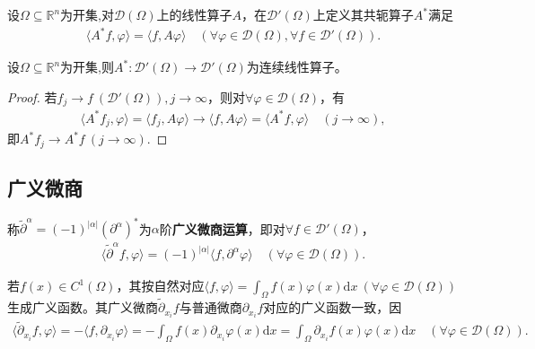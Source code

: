 \documentclass[../../main.tex]{subfiles}%
\begin{document}
\begin{definition}
设$\Omega\subseteq\mathbb{R}^n$为开集,对$\mathscr{D}(\Omega)$上的线性算子$A$，在$\mathscr{D}'(\Omega)$上定义其共轭算子$A^*$满足
\begin{align*}
\langle A^*f,\varphi\rangle=\langle f,A\varphi\rangle\quad(\forall\varphi\in\mathscr{D}(\Omega),\forall f\in\mathscr{D}'(\Omega)).
\end{align*}
\end{definition}

\begin{proposition}
设$\Omega\subseteq\mathbb{R}^n$为开集,则$A^*:\mathscr{D}'(\Omega)\to\mathscr{D}'(\Omega)$为连续线性算子。
\end{proposition}
\begin{proof}

若$f_j\to f\ (\mathscr{D}'(\Omega)),j\to\infty$，则对$\forall\varphi\in\mathscr{D}(\Omega)$，有
\begin{align*}
\langle A^*f_j,\varphi\rangle=\langle f_j,A\varphi\rangle\to\langle f,A\varphi\rangle=\langle A^*f,\varphi\rangle\quad(j\to\infty),
\end{align*}
即$A^*f_j\to A^*f\ (j\to\infty)$.

\end{proof}

\subsection{广义微商}
\begin{definition}
称$\widetilde{\partial}^\alpha=(-1)^{|\alpha|}(\partial^\alpha)^*$为$\alpha$阶\textbf{广义微商运算}，即对$\forall f\in\mathscr{D}'(\Omega)$，
\begin{align*}
\langle\widetilde{\partial}^\alpha f,\varphi\rangle=(-1)^{|\alpha|}\langle f,\partial^\alpha\varphi\rangle\quad(\forall\varphi\in\mathscr{D}(\Omega)).
\end{align*}
\end{definition}

\begin{remark}
若$f(x)\in C^1(\Omega)$，其按自然对应$\langle f,\varphi\rangle=\int_{\Omega}f(x)\varphi(x)\mathrm{d}x\ (\forall\varphi\in\mathscr{D}(\Omega))$生成广义函数。其广义微商$\widetilde{\partial}_{x_i}f$与普通微商$\partial_{x_i}f$对应的广义函数一致，因
\begin{align*}
\langle\widetilde{\partial}_{x_i}f,\varphi\rangle=-\langle f,\partial_{x_i}\varphi\rangle=-\int_{\Omega}f(x)\partial_{x_i}\varphi(x)\mathrm{d}x=\int_{\Omega}\partial_{x_i}f(x)\varphi(x)\mathrm{d}x\quad(\forall\varphi\in\mathscr{D}(\Omega)).
\end{align*}
\end{remark}
\end{document}
